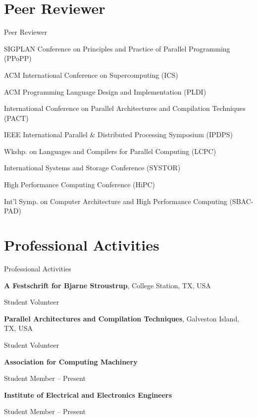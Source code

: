 \documentclass[a4paper,10pt,oneside]{article}
\begin{document}
\begin{body}

\section{Peer Reviewer}
{Peer Reviewer}

SIGPLAN Conference on Principles and Practice of Parallel Programming (PPoPP)
\par ACM International Conference on Supercomputing (ICS)
\par ACM Programming Language Design and Implementation (PLDI)
\par International Conference on Parallel Architectures and Compilation Techniques (PACT)
\par IEEE International Parallel \& Distributed Processing Symposium (IPDPS)
\par Wkshp. on Languages and Compilers for Parallel Computing (LCPC)
\par International Systems and Storage Conference (SYSTOR)
\par High Performance Computing Conference (HiPC)
\par Int'l Symp. on Computer Architecture and High Performance Computing (SBAC-PAD)


\section{Professional Activities}
{Professional Activities}

{\textbf{A Festschrift for Bjarne Stroustrup}, College Station, TX, USA }
\par
Student Volunteer
\hfill
{}

\EntryGap


{\textbf{Parallel Architectures and Compilation Techniques}, Galveston Island, TX, USA }
\par
Student Volunteer
\hfill
{}


\EntryGap

{\textbf{Association for Computing Machinery}}
\par
Student Member
\hfill
{} --
Present

\EntryGap
{\textbf{Institute of Electrical and Electronics Engineers }}
\par
Student Member
\hfill
{} --
Present



\end{body}
\end{document}
